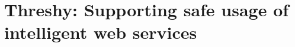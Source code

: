 \chapter[Supporting safe usage of intelligent web services]
{Threshy: Supporting safe usage of intelligent web services}
\label{ch:icse2020-demo}
\graphicspath{{mainmatter/publications/figures/icse2020-demo/}}